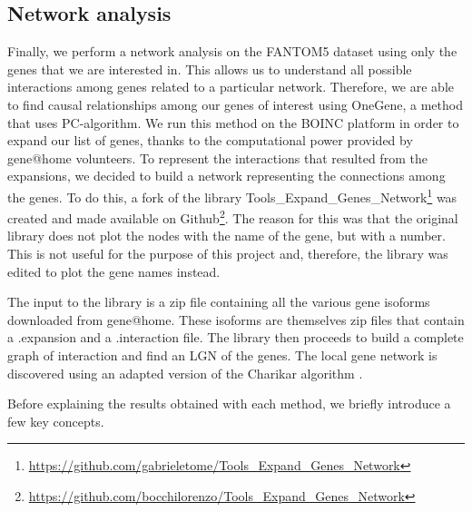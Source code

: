 \documentclass[journal]{IEEEtran}
\begin{document}
\subsection{Network analysis}
Finally, we perform a network analysis on the FANTOM5 dataset using only the genes that we are interested in. This allows us to understand all possible interactions among genes related to a particular network. Therefore, we are able to find causal relationships among our genes of interest using OneGene, a method that uses PC-algorithm. We run this method on the BOINC platform in order to expand our list of genes, thanks to the computational power provided by gene@home volunteers. To represent the interactions that resulted from the expansions, we decided to build a network representing the connections among the genes. To do this, a fork of the library Tools\_Expand\_Genes\_Network\footnote{\url{https://github.com/gabrieletome/Tools_Expand_Genes_Network}} was created and made available on Github\footnote{\url{https://github.com/bocchilorenzo/Tools_Expand_Genes_Network}}. The reason for this was that the original library does not plot the nodes with the name of the gene, but with a number. This is not useful for the purpose of this project and, therefore, the library was edited to plot the gene names instead.

The input to the library is a zip file containing all the various gene isoforms downloaded from gene@home. These isoforms are themselves zip files that contain a .expansion and a .interaction file. The library then proceeds to build a complete graph of interaction and find an LGN of the genes. The local gene network is discovered using an adapted version of the Charikar algorithm \cite{10.5555/646688.702972}.

Before explaining the results obtained with each method, we briefly introduce a few key concepts.
\end{document}
